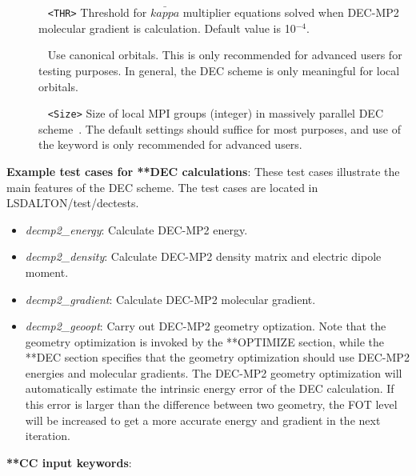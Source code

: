 \begin{description}
\item[] \verb| | \newline
\verb|<THR>|\newline
Threshold for $\bar{kappa}$ multiplier equations solved when DEC-MP2 molecular gradient is calculation. Default value is 10$^{-4}$.


\item[] \verb| | \newline
Use canonical orbitals. This is only recommended for advanced users for testing purposes. In general, the DEC scheme is only meaningful for local orbitals.

\item[] \verb| | \newline
\verb|<Size>|\newline
Size of local MPI groups (integer) in massively parallel DEC scheme~\cite{dec6}. The default settings should suffice for most purposes, and use of the keyword is only recommended for advanced users.


\end{description}

\vspace{1 cm}
\noindent
\textbf{Example test cases for **DEC calculations}: \newline
These test cases illustrate the main features of the DEC scheme. The test cases are located in LSDALTON/test/dectests.

\begin{itemize}
\item
\textit{decmp2\_energy}: Calculate DEC-MP2 energy.
\item
\textit{decmp2\_density}: Calculate DEC-MP2 density matrix and electric dipole moment.
\item
\textit{decmp2\_gradient}: Calculate DEC-MP2 molecular gradient.
\item
\textit{decmp2\_geoopt}: Carry out DEC-MP2 geometry optization. Note that the geometry optimization is invoked by the **OPTIMIZE section, while the **DEC section specifies that the geometry optimization should use DEC-MP2 energies and molecular gradients. The DEC-MP2 geometry optimization will automatically estimate the intrinsic energy error of the DEC calculation. If this error is larger than the difference between two geometry, the FOT level will be increased to get a more accurate energy and gradient in the next iteration.
\end{itemize}


\vspace{1 cm}
\noindent
\textbf{**CC input keywords}:

